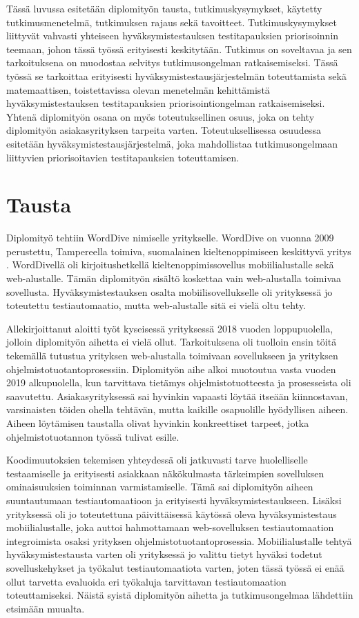 Tässä luvussa esitetään diplomityön tausta, tutkimuskysymykset, käytetty tutkimusmenetelmä, tutkimuksen rajaus sekä tavoitteet.
Tutkimuskysymykset liittyvät vahvasti yhteiseen hyväksymistestauksen testitapauksien priorisoinnin teemaan, johon tässä työssä erityisesti keskitytään.
Tutkimus on soveltavaa ja sen tarkoituksena on muodostaa selvitys tutkimusongelman ratkaisemiseksi.
Tässä työssä se tarkoittaa erityisesti hyväksymistestausjärjestelmän toteuttamista sekä matemaattisen, toistettavissa olevan menetelmän kehittämistä hyväksymistestauksen testitapauksien priorisointiongelman ratkaisemiseksi.
Yhtenä diplomityön osana on myös toteutuksellinen osuus, joka on tehty diplomityön asiakasyrityksen tarpeita varten.
Toteutuksellisessa osuudessa esitetään hyväksymistestausjärjestelmä, joka mahdollistaa tutkimusongelmaan liittyvien priorisoitavien testitapauksien toteuttamisen.

\section{Tausta} \label{ch:06_tausta}

  Diplomityö tehtiin WordDive nimiselle yritykselle. WordDive on vuonna 2009 perustettu, Tampereella toimiva, suomalainen kieltenoppimiseen keskittyvä yritys \parencite{worddive_details}.
  WordDivellä oli kirjoitushetkellä kieltenoppimissovellus mobiilialustalle sekä web-alustalle.
  Tämän diplomityön sisältö koskettaa vain web-alustalla toimivaa sovellusta.
  Hyväksymistestauksen osalta mobiilisovellukselle oli yrityksessä jo toteutettu testiautomaatio, mutta web-alustalle sitä ei vielä oltu tehty.

  Allekirjoittanut aloitti työt kyseisessä yrityksessä 2018 vuoden loppupuolella, jolloin diplomityön aihetta ei vielä ollut.
  Tarkoituksena oli tuolloin ensin töitä tekemällä tutustua yrityksen web-alustalla toimivaan sovellukseen ja yrityksen ohjelmistotuotantoprosessiin.
  Diplomityön aihe alkoi muotoutua vasta vuoden 2019 alkupuolella, kun tarvittava tietämys ohjelmistotuotteesta ja prosesseista oli saavutettu.
  Asiakasyrityksessä sai hyvinkin vapaasti löytää itseään kiinnostavan, varsinaisten töiden ohella tehtävän, mutta kaikille osapuolille hyödyllisen aiheen.
  Aiheen löytämisen taustalla olivat hyvinkin konkreettiset tarpeet, jotka ohjelmistotuotannon työssä tulivat esille.

  Koodimuutoksien tekemisen yhteydessä oli jatkuvasti tarve huolelliselle testaamiselle ja erityisesti asiakkaan näkökulmasta tärkeimpien sovelluksen ominaisuuksien toiminnan varmistamiselle.
  Tämä sai diplomityön aiheen suuntautumaan testiautomaatioon ja erityisesti hyväksymistestaukseen.
  Lisäksi yrityksessä oli jo toteutettuna päivittäisessä käytössä oleva hyväksymistestaus mobiilialustalle, joka auttoi hahmottamaan web-sovelluksen testiautomaation integroimista osaksi yrityksen ohjelmistotuotantoprosessia.
  Mobiilialustalle tehtyä hyväksymistestausta varten oli yrityksessä jo valittu tietyt hyväksi todetut sovelluskehykset ja työkalut testiautomaatiota varten, joten tässä työssä ei enää ollut tarvetta evaluoida eri työkaluja tarvittavan testiautomaation toteuttamiseksi.
  Näistä syistä diplomityön aihetta ja tutkimusongelmaa lähdettiin etsimään muualta.

